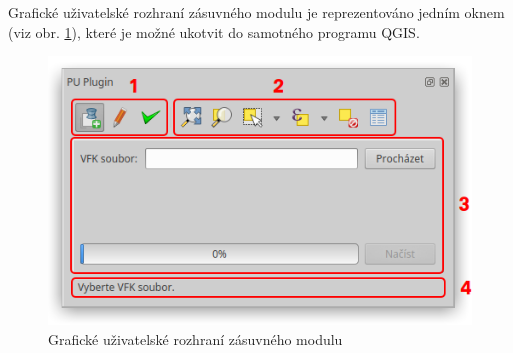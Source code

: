 Grafické uživatelské rozhraní zásuvného modulu je reprezentováno jedním oknem (viz obr. \ref{fig:main_gui}), které je možné ukotvit do samotného programu QGIS.

	\begin{figure}[H]
		\centering
		\includegraphics[width=.7\textwidth]{./pictures/main_gui.png}
		\caption[Grafické uživatelské rozhraní zásuvného modulu]{Grafické uživatelské rozhraní zásuvného modulu}
		\label{fig:main_gui}
 	\end{figure}

